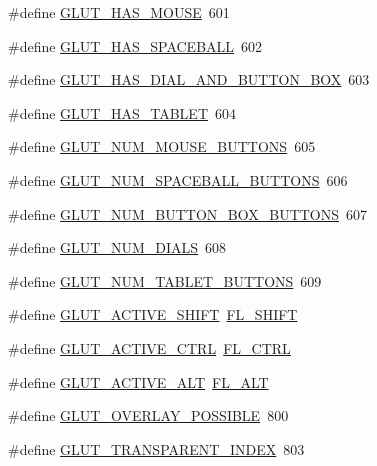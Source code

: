 \begin{DoxyCompactItemize}
\#define \hyperlink{glut_8_h_a4d860760b75e8ba688820a8917f54aa6}{G\+L\+U\+T\+\_\+\+H\+A\+S\+\_\+\+M\+O\+U\+SE}~601
\item 
\#define \hyperlink{glut_8_h_ac6f10f5ba7fa1db4236ff4350cbece04}{G\+L\+U\+T\+\_\+\+H\+A\+S\+\_\+\+S\+P\+A\+C\+E\+B\+A\+LL}~602
\item 
\#define \hyperlink{glut_8_h_a118efbf04d3b594b7fca68920254d2fe}{G\+L\+U\+T\+\_\+\+H\+A\+S\+\_\+\+D\+I\+A\+L\+\_\+\+A\+N\+D\+\_\+\+B\+U\+T\+T\+O\+N\+\_\+\+B\+OX}~603
\item 
\#define \hyperlink{glut_8_h_ab909efdd1d504d879e958b36dedc2173}{G\+L\+U\+T\+\_\+\+H\+A\+S\+\_\+\+T\+A\+B\+L\+ET}~604
\item 
\#define \hyperlink{glut_8_h_a202d9c83876fe0b87d1af980463caefa}{G\+L\+U\+T\+\_\+\+N\+U\+M\+\_\+\+M\+O\+U\+S\+E\+\_\+\+B\+U\+T\+T\+O\+NS}~605
\item 
\#define \hyperlink{glut_8_h_aa4ff5141791cc3999281dcdb1fadc4a5}{G\+L\+U\+T\+\_\+\+N\+U\+M\+\_\+\+S\+P\+A\+C\+E\+B\+A\+L\+L\+\_\+\+B\+U\+T\+T\+O\+NS}~606
\item 
\#define \hyperlink{glut_8_h_af5f59269acd5687125d7c3c7b6e3fd35}{G\+L\+U\+T\+\_\+\+N\+U\+M\+\_\+\+B\+U\+T\+T\+O\+N\+\_\+\+B\+O\+X\+\_\+\+B\+U\+T\+T\+O\+NS}~607
\item 
\#define \hyperlink{glut_8_h_a494de5ea1c0624bd31f8aa3ea919494b}{G\+L\+U\+T\+\_\+\+N\+U\+M\+\_\+\+D\+I\+A\+LS}~608
\item 
\#define \hyperlink{glut_8_h_aee4d8f95dfd13e13f762c3a081c6036a}{G\+L\+U\+T\+\_\+\+N\+U\+M\+\_\+\+T\+A\+B\+L\+E\+T\+\_\+\+B\+U\+T\+T\+O\+NS}~609
\item 
\#define \hyperlink{glut_8_h_a074ada7313052bd2a64a65dbfba76e33}{G\+L\+U\+T\+\_\+\+A\+C\+T\+I\+V\+E\+\_\+\+S\+H\+I\+FT}~\hyperlink{_enumerations_8_h_aa0d93ca1bc8a0c7f84888cdf458f043d}{F\+L\+\_\+\+S\+H\+I\+FT}
\item 
\#define \hyperlink{glut_8_h_a67d60a193db259524360cfb6b39a0c82}{G\+L\+U\+T\+\_\+\+A\+C\+T\+I\+V\+E\+\_\+\+C\+T\+RL}~\hyperlink{_enumerations_8_h_a29324ec5ac8c1d87950127d387dc83e8}{F\+L\+\_\+\+C\+T\+RL}
\item 
\#define \hyperlink{glut_8_h_a37fa1ad406c601777f4b9d64319fa20c}{G\+L\+U\+T\+\_\+\+A\+C\+T\+I\+V\+E\+\_\+\+A\+LT}~\hyperlink{_enumerations_8_h_a58b1ac5446b292c77043f99558eb07cb}{F\+L\+\_\+\+A\+LT}
\item 
\#define \hyperlink{glut_8_h_a7bebe6fa7f34719ba4d19d94f4445049}{G\+L\+U\+T\+\_\+\+O\+V\+E\+R\+L\+A\+Y\+\_\+\+P\+O\+S\+S\+I\+B\+LE}~800
\item 
\#define \hyperlink{glut_8_h_a99aa25e36a0b01c418a79ce1219dbf56}{G\+L\+U\+T\+\_\+\+T\+R\+A\+N\+S\+P\+A\+R\+E\+N\+T\+\_\+\+I\+N\+D\+EX}~803

\end{DoxyCompactItemize}
